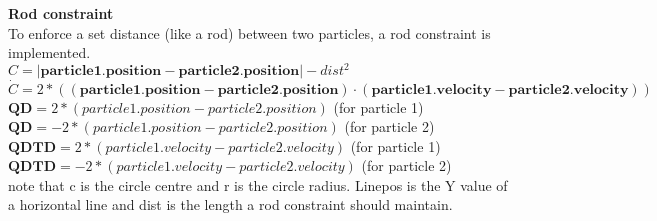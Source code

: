 \smallskip
\textbf{Rod constraint} \\
To enforce a set distance (like a rod) between two particles, a rod constraint is implemented. \\
$C = |\boldsymbol{particle1.position} - \boldsymbol{particle2.position}| - dist^2$ \\
$\dot{C} = 2*((\boldsymbol{particle1.position} - \boldsymbol{particle2.position}) \cdot (\boldsymbol{particle1.velocity} - \boldsymbol{particle2.velocity})	) $ \\
$\boldsymbol{QD} = 2*(particle1.position - particle2.position)$ (for particle 1) \\
$\boldsymbol{QD} = -2*(particle1.position - particle2.position)$ (for particle 2) \\
$\boldsymbol{QDTD}= 2*(particle1.velocity - particle2.velocity)$ (for particle 1)\\
$\boldsymbol{QDTD}= -2*(particle1.velocity - particle2.velocity)$ (for particle 2)\\

\smallskip
note that c is the circle centre and r is the circle radius. Linepos is the Y value of a horizontal line and dist is the length a rod constraint should maintain.

